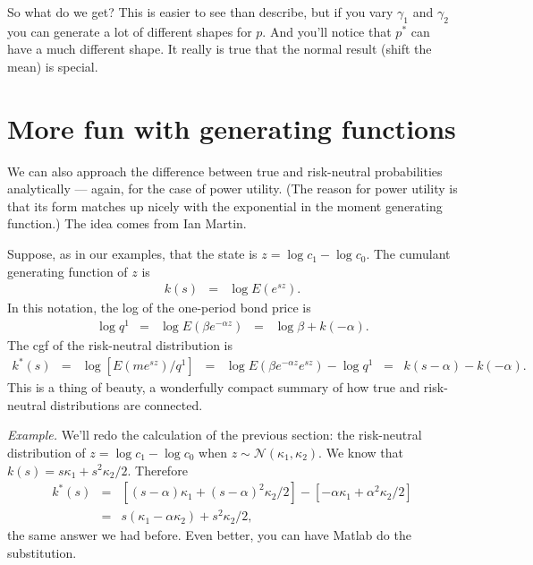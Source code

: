 \documentclass[11pt]{article}
\begin{document}
So what do we get?
This is easier to see than describe, but if you vary
$\gamma_1$ and $\gamma_2$ you can generate a lot of different shapes
for $p$.
And you'll notice that $p^*$ can have a much different shape.
It really is true that the normal result (shift the mean) is special.


\section{More fun with generating functions}

We can also approach the difference between true and risk-neutral
probabilities analytically --- again, for the case of power utility.
(The reason for power utility is that its form matches up nicely
with the exponential in the moment generating function.)
The idea comes from Ian Martin.

Suppose, as in our examples,
that the state is $ z = \log c_1 - \log c_0$.
The cumulant generating function  of $z$ is
\begin{eqnarray*}
    k(s) &=& \log E (e^{sz}) .
\end{eqnarray*}
In this notation, the log of the one-period bond price is
\begin{eqnarray*}
    \log q^1  &=& \log E (\beta e^{-\alpha z})
            \;\;=\;\; \log \beta +  k(-\alpha).
\end{eqnarray*}
The cgf of the risk-neutral distribution is
\begin{eqnarray}
    k^*(s) &=& \log [E (m e^{sz})/q^1]
        \;\;=\;\;   \log E \left( \beta e^{-\alpha z}e^{sz} \right) - \log q^1
        \;\;=\;\;  k(s-\alpha) - k(-\alpha)  .
        \label{eq:risk-neutral-cgf}
\end{eqnarray}
This is a thing of beauty, a wonderfully compact
summary of how true and risk-neutral distributions are connected.

{\it Example.\/}
We'll redo the calculation of the previous section:
the risk-neutral distribution of $z = \log c_1 - \log c_0$
when $z \sim \mathcal{N}(\kappa_1,\kappa_2)$.
We know that $k(s) = s \kappa_1 + s^2 \kappa_2/2$.
Therefore
\begin{eqnarray*}
    k^*(s) &=& [(s-\alpha) \kappa_1 + (s-\alpha)^2 \kappa_2/2]
            - [-\alpha \kappa_1 + \alpha^2 \kappa_2/2]  \\
           &=& s(\kappa_1 - \alpha \kappa_2) + s^2 \kappa_2/2 ,
\end{eqnarray*}
the same answer we had before.
Even better, you can have Matlab do the substitution.
\end{document}
